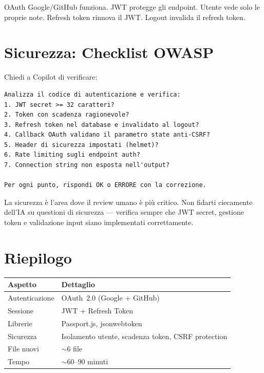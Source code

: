 \begin{checkpointbox}
OAuth Google/GitHub funziona. JWT protegge gli endpoint. Utente vede solo le proprie note. Refresh token rinnova il JWT. Logout invalida il refresh token.
\end{checkpointbox}

\section{Sicurezza: Checklist OWASP}

\begin{praticabox}[title={Pratica --- Verifica sicurezza}]
Chiedi a Copilot di verificare:
\begin{lstlisting}[language={}]
Analizza il codice di autenticazione e verifica:
1. JWT secret >= 32 caratteri?
2. Token con scadenza ragionevole?
3. Refresh token nel database e invalidato al logout?
4. Callback OAuth validano il parametro state anti-CSRF?
5. Header di sicurezza impostati (helmet)?
6. Rate limiting sugli endpoint auth?
7. Connection string non esposta nell'output?

Per ogni punto, rispondi OK o ERRORE con la correzione.
\end{lstlisting}
\end{praticabox}

\begin{dangerbox}
La sicurezza è l'area dove il review umano è più critico. Non fidarti ciecamente dell'IA su questioni di sicurezza --- verifica sempre che JWT secret, gestione token e validazione input siano implementati correttamente.
\end{dangerbox}

\section*{Riepilogo}

\begin{center}
\begin{tabularx}{\textwidth}{l X}
\toprule
\textbf{Aspetto} & \textbf{Dettaglio} \\
\midrule
Autenticazione & OAuth~2.0 (Google + GitHub) \\
Sessione & JWT + Refresh Token \\
Librerie & Passport.js, jsonwebtoken \\
Sicurezza & Isolamento utente, scadenza token, CSRF protection \\
File nuovi & $\sim$6 file \\
Tempo & $\sim$60--90 minuti \\
\bottomrule
\end{tabularx}
\end{center}
